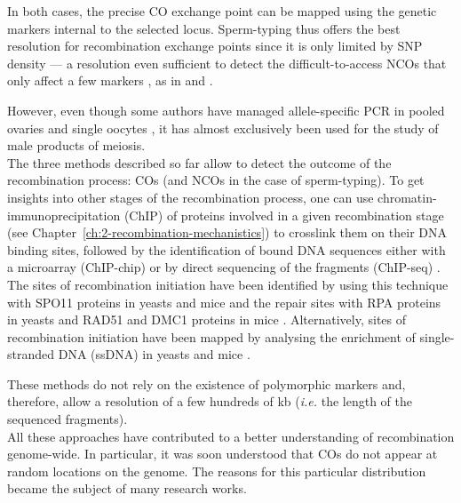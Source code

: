 In both cases, the precise CO exchange point can be mapped using the genetic markers internal to the selected locus.
Sperm-typing thus offers the best resolution for recombination exchange points since it is only limited by SNP density — a resolution even sufficient to detect the difficult-to-access NCOs that only affect a few markers \citep{hellenthal2006insights}, as in \citet{tusie-luna1995gene} and \citet{guillon2002initiation}.

However, even though some authors have managed allele-specific PCR in pooled ovaries \citep{guillon2005crossover, baudat2007cis} and single oocytes \citep{cole2014mouse}, it has almost exclusively been used for the study of male products of meiosis.\\

The three methods described so far allow to detect the outcome of the recombination process: COs (and NCOs in the case of sperm-typing).
To get insights into other stages of the recombination process, one can use chromatin-immunoprecipitation (ChIP) of proteins involved in a given recombination stage (see Chapter~\ref{ch:2-recombination-mechanistics}) to crosslink them on their DNA binding sites, followed by the identification of bound DNA sequences either with a microarray (ChIP-chip) or by direct sequencing of the fragments (ChIP-seq) \citep[reviewed in][]{park2009chipseq}. 
The sites of recombination initiation have been identified by using this technique with SPO11 proteins in yeasts \citep{gerton2000global,mieczkowski2007loss,pan2011hierarchical} and mice \citep{lange2016landscape} and the repair sites with RPA proteins in yeasts \citep{borde2009histone} and RAD51 and DMC1 proteins in mice \citep{smagulova2011genomewide,brick2012genetic}.
Alternatively, sites of recombination initiation have been mapped by analysing the enrichment of single-stranded DNA (ssDNA) in yeasts \citep{blitzblau2007mapping,buhler2007mapping} and mice \citep{khil2012sensitive}.

These methods do not rely on the existence of polymorphic markers and, therefore, allow a resolution of a few hundreds of kb (\textit{i.e.} the length of the sequenced fragments).\\


All these approaches have contributed to a better understanding of recombination genome-wide.
In particular, it was soon understood that COs do not appear at random locations on the genome.
The reasons for this particular distribution became the subject of many research works.




